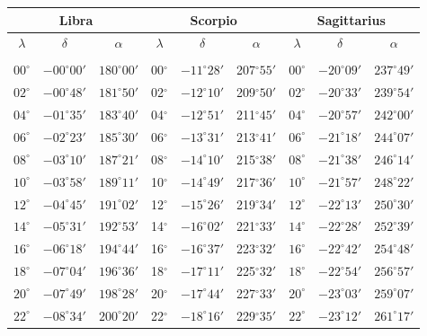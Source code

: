 \clearpage
\begin{table}[!h]
\vspace{0.25cm}
\centering
\begin{tabular}{ccc|ccc|ccc}
\multicolumn{3}{c}{Libra}\vline & \multicolumn{3}{c}{Scorpio} \vline& \multicolumn{3}{c}{Sagittarius}\\\hline
$\lambda$& $\delta$& $\alpha$& $\lambda$& $\delta$& $\alpha$& $\lambda$& $\delta$& $\alpha$\\\hline
&&&&&&&&\\[-2ex]
$00^\circ$ & $-00^\circ00'$ & $180^\circ00'$ & 00$^\circ$ & $-11^\circ28'$ & 207$^\circ$$55'$ & $00^\circ$ & $-20^\circ09'$ & $237^\circ49'$\\
$02^\circ$ & $-00^\circ48'$ & $181^\circ50'$ & 02$^\circ$ & $-12^\circ10'$ & 209$^\circ$$50'$ & $02^\circ$ & $-20^\circ33'$ & $239^\circ54'$\\
$04^\circ$ & $-01^\circ35'$ & $183^\circ40'$ & 04$^\circ$ & $-12^\circ51'$ & 211$^\circ$$45'$ & $04^\circ$ & $-20^\circ57'$ & $242^\circ00'$\\
$06^\circ$ & $-02^\circ23'$ & $185^\circ30'$ & 06$^\circ$ & $-13^\circ31'$ & 213$^\circ$$41'$ & $06^\circ$ & $-21^\circ18'$ & $244^\circ07'$\\
$08^\circ$ & $-03^\circ10'$ & $187^\circ21'$ & 08$^\circ$ & $-14^\circ10'$ & 215$^\circ$$38'$ & $08^\circ$ & $-21^\circ38'$ & $246^\circ14'$\\
$10^\circ$ & $-03^\circ58'$ & $189^\circ11'$ & 10$^\circ$ & $-14^\circ49'$ & 217$^\circ$$36'$ & $10^\circ$ & $-21^\circ57'$ & $248^\circ22'$\\
$12^\circ$ & $-04^\circ45'$ & $191^\circ02'$ & 12$^\circ$ & $-15^\circ26'$ & 219$^\circ$$34'$ & $12^\circ$ & $-22^\circ13'$ & $250^\circ30'$\\
$14^\circ$ & $-05^\circ31'$ & $192^\circ53'$ & 14$^\circ$ & $-16^\circ02'$ & 221$^\circ$$33'$ & $14^\circ$ & $-22^\circ28'$ & $252^\circ39'$\\
$16^\circ$ & $-06^\circ18'$ & $194^\circ44'$ & 16$^\circ$ & $-16^\circ37'$ & 223$^\circ$$32'$ & $16^\circ$ & $-22^\circ42'$ & $254^\circ48'$\\
$18^\circ$ & $-07^\circ04'$ & $196^\circ36'$ & 18$^\circ$ & $-17^\circ11'$ & 225$^\circ$$32'$ & $18^\circ$ & $-22^\circ54'$ & $256^\circ57'$\\
$20^\circ$ & $-07^\circ49'$ & $198^\circ28'$ & 20$^\circ$ & $-17^\circ44'$ & 227$^\circ$$33'$ & $20^\circ$ & $-23^\circ03'$ & $259^\circ07'$\\
$22^\circ$ & $-08^\circ34'$ & $200^\circ20'$ & 22$^\circ$ & $-18^\circ16'$ & 229$^\circ$$35'$ & $22^\circ$ & $-23^\circ12'$ & $261^\circ17'$\\

\end{tabular}
\end{table}
